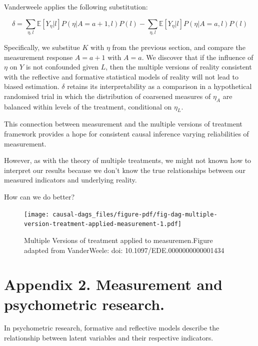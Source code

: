 \documentclass[
  singlecolumn]{report}
\begin{document}
Vanderweele applies the following substitution:

\[\delta = \sum_{\eta,l} \mathbb{E}[Y_\eta|l] P(\eta|A=a+1,l) P(l) - \sum_{\eta,l} \mathbb{E}[Y_\eta|l] P(\eta|A=a,l) P(l)\]

Specifically, we substitue \(K\) with \(\eta\) from the previous
section, and compare the measurement response \(A = a + 1\) with
\(A = a\). We discover that if the influence of \(\eta\) on \(Y\) is not
confounded given \(L\), then the multiple versions of reality consistent
with the reflective and formative statistical models of reality will not
lead to biased estimation. \(\delta\) retains its interpretability as a
comparison in a hypothetical randomised trial in which the distribution
of coarsened measures of \(\eta_A\) are balanced within levels of the
treatment, conditional on \(\eta_L\).

This connection between measurement and the multiple versions of
treatment framework provides a hope for consistent causal inference
varying reliabilities of measurement.

However, as with the theory of multiple treatments, we might not known
how to interpret our results because we don't know the true
relationships between our measured indicators and underlying reality.

How can we do better?

\begin{figure}

{\centering \texttt{[image: causal-dags\_files/figure-pdf/fig-dag-multiple-version-treatment-applied-measurement-1.pdf]}

}

\caption{\label{fig-dag-multiple-version-treatment-applied-measurement}Multiple
Versions of treatment applied to measuremen.Figure adapted from
VanderWeele: doi: 10.1097/EDE.0000000000001434}

\end{figure}

\hypertarget{appendix-2.-measurement-and-psychometric-research.}{%
\section{Appendix 2. Measurement and psychometric
research.}\label{appendix-2.-measurement-and-psychometric-research.}}

In psychometric research, formative and reflective models describe the
relationship between latent variables and their respective indicators.
\end{document}
